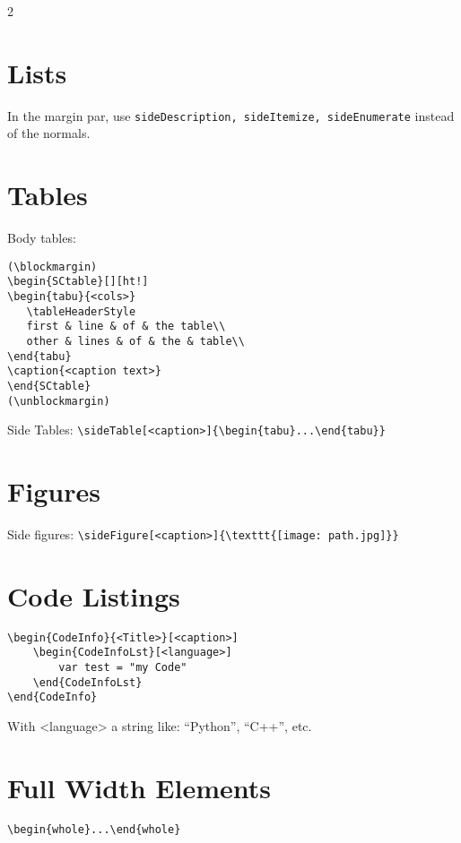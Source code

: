 \documentclass[a4paper, 11pt, oneside, fleqn]{article}
\begin{document}
\begin{multicols}{2}
		
		\section{Lists}
		In the margin par, use \lstinline[breaklines]|sideDescription, sideItemize, sideEnumerate| instead of the normals.
		
		
		\section{Tables}
		Body tables:
		\begin{lstlisting}
(\blockmargin)
\begin{SCtable}[][ht!]
\begin{tabu}{<cols>}
   \tableHeaderStyle
   first & line & of & the table\\
   other & lines & of & the & table\\
\end{tabu}
\caption{<caption text>}
\end{SCtable}
(\unblockmargin)
		\end{lstlisting}
		
		Side Tables: \lstinline[breaklines]|\sideTable[<caption>]{\begin{tabu}...\end{tabu}}|
		
		
		\section{Figures}
		Side figures: \lstinline[breaklines]|\sideFigure[<caption>]{\texttt{[image: path.jpg]}}|
		
		
		\section{Code Listings}
\begin{lstlisting}
\begin{CodeInfo}{<Title>}[<caption>]
	\begin{CodeInfoLst}[<language>]
		var test = "my Code"
	\end{CodeInfoLst}
\end{CodeInfo}
\end{lstlisting}

		With <language> a string like: \enquote{Python}, \enquote{C++}, etc.
		
		
		\section{Full Width Elements}
		\lstinline[breaklines]|\begin{whole}...\end{whole}|
		

\end{multicols}
\end{document}
